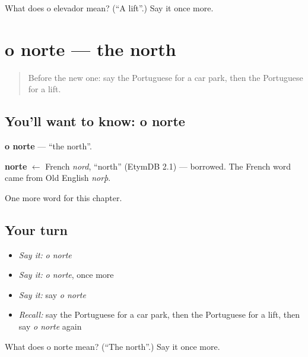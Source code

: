 \begin{tcolorbox}[breakable,colback=teal!4,colframe=teal!35!black,title={Before you move on}]
What does o elevador mean? (\textquotedblleft{}A lift\textquotedblright{}.) Say it once more.
\end{tcolorbox}
\section[o norte]{o norte — the north}

\label{lesson:PT-C88-norte}



\begin{quote}
Before the new one: say the Portuguese for a car park, then the Portuguese for a lift.
\end{quote}

\subsection*{You'll want to know: o norte}
\textbf{o norte} — \textquotedblleft{}the north\textquotedblright{}.

\begin{cousinweb}
\textbf{norte} $\leftarrow$ French \emph{nord}, \textquotedblleft{}north\textquotedblright{} (EtymDB 2.1) — borrowed. The French word came from Old English \emph{norþ}.
\end{cousinweb}

\begin{grammarlens}[title={What you've built}]
One more word for this chapter.
\end{grammarlens}

\subsection*{Your turn}
\begin{itemize}
\raggedright
  \item \emph{Say it:} \emph{o norte}
  \item \emph{Say it:} \emph{o norte}, once more
  \item \emph{Say it:} say \emph{o norte}
  \item \emph{Recall:} say the Portuguese for a car park, then the Portuguese for a lift, then say \emph{o norte} again
\end{itemize}

\begin{tcolorbox}[breakable,colback=teal!4,colframe=teal!35!black,title={Before you move on}]
What does o norte mean? (\textquotedblleft{}The north\textquotedblright{}.) Say it once more.
\end{tcolorbox}

